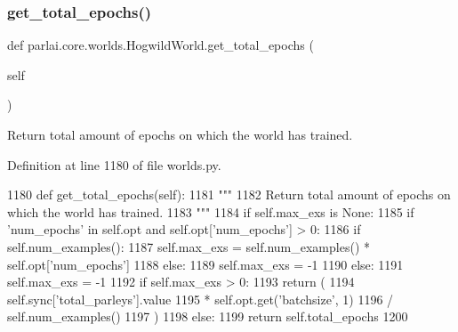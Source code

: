 \subsubsection{\texorpdfstring{get\+\_\+total\+\_\+epochs()}{get\_total\_epochs()}}
{\footnotesize\ttfamily def parlai.\+core.\+worlds.\+Hogwild\+World.\+get\+\_\+total\+\_\+epochs (\begin{DoxyParamCaption}\item[{}]{self }\end{DoxyParamCaption})}

\begin{DoxyVerb}Return total amount of epochs on which the world has trained.
\end{DoxyVerb}
 

Definition at line 1180 of file worlds.\+py.


\begin{DoxyCode}
1180     \textcolor{keyword}{def }get\_total\_epochs(self):
1181         \textcolor{stringliteral}{"""}
1182 \textcolor{stringliteral}{        Return total amount of epochs on which the world has trained.}
1183 \textcolor{stringliteral}{        """}
1184         \textcolor{keywordflow}{if} self.max\_exs \textcolor{keywordflow}{is} \textcolor{keywordtype}{None}:
1185             \textcolor{keywordflow}{if} \textcolor{stringliteral}{'num\_epochs'} \textcolor{keywordflow}{in} self.opt \textcolor{keywordflow}{and} self.opt[\textcolor{stringliteral}{'num\_epochs'}] > 0:
1186                 \textcolor{keywordflow}{if} self.num\_examples():
1187                     self.max\_exs = self.num\_examples() * self.opt[\textcolor{stringliteral}{'num\_epochs'}]
1188                 \textcolor{keywordflow}{else}:
1189                     self.max\_exs = -1
1190             \textcolor{keywordflow}{else}:
1191                 self.max\_exs = -1
1192         \textcolor{keywordflow}{if} self.max\_exs > 0:
1193             \textcolor{keywordflow}{return} (
1194                 self.sync[\textcolor{stringliteral}{'total\_parleys'}].value
1195                 * self.opt.get(\textcolor{stringliteral}{'batchsize'}, 1)
1196                 / self.num\_examples()
1197             )
1198         \textcolor{keywordflow}{else}:
1199             \textcolor{keywordflow}{return} self.total\_epochs
1200 
\end{DoxyCode}
\mbox{\label{classparlai_1_1core_1_1worlds_1_1HogwildWorld_a0e26cfad1c63628cb43f554c470426b9}} 
